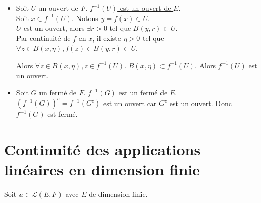 \documentclass[]{article}
\begin{document}
\begin{itemize}
    \item Soit $U$ un ouvert de $F$. \underline{$f^{-1}(U)$ est un ouvert de $E$}. \\
    
    Soit $x \in f^{-1}(U)$. Notons $y = f(x) \in U$. \\
    
    $U$ est un ouvert, alors $\exists r > 0$ tel que $B(y, r) \subset U$. \\

    Par continuité de $f$ en $x$, il existe $\eta > 0$ tel que $\forall z \in B(x, \eta), f(z) \in B(y, r) \subset U$. 
    
    Alors $\forall z \in B(x, \eta), z \in f^{-1}(U)$. $B(x, \eta) \subset f^{-1}(U)$. Alors $f^{-1}(U)$ est un ouvert. 

    \item Soit $G$ un fermé de $F$. \underline{$f^{-1}(G)$ est un fermé de $E$}. \\
    
    $(f^{-1}(G))^c = f^{-1}(G^c)$ est un ouvert car $G^c$ est un ouvert. Donc $f^{-1}(G)$ est fermé. 
\end{itemize}

\section{Continuité des applications linéaires en dimension finie}

Soit $u \in \mathcal{L}(E, F)$ avec $E$ de dimension finie. 
\end{document}

